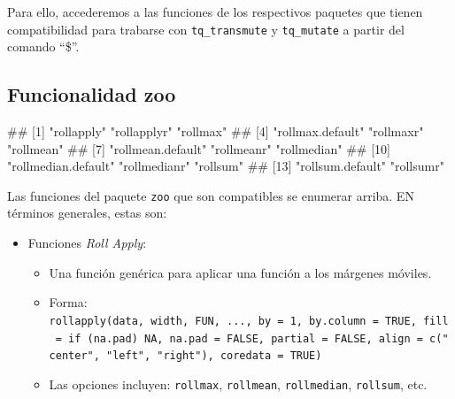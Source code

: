 \documentclass[
]{book}
\newenvironment{Shaded}{\begin{snugshade}}{\end{snugshade}}
\newcommand{\FunctionTok}[1]{\textcolor[rgb]{0.13,0.29,0.53}{\textbf{#1}}}
\newcommand{\NormalTok}[1]{#1}
\newcommand{\SpecialCharTok}[1]{\textcolor[rgb]{0.81,0.36,0.00}{\textbf{#1}}}
\providecommand{\tightlist}{%
  \setlength{\itemsep}{0pt}\setlength{\parskip}{0pt}}
\begin{document}
Para ello, accederemos a las funciones de los respectivos paquetes que tienen compatibilidad para trabarse con \texttt{tq\_transmute} y \texttt{tq\_mutate} a partir del comando ``\$''.

\hypertarget{funcionalidad-zoo}{%
\subsection{Funcionalidad zoo}\label{funcionalidad-zoo}}

\begin{Shaded}
\end{Shaded}

\begin{Shaded}
\begin{Highlighting}[]
\NormalTok{\#\#  [1] "rollapply"          "rollapplyr"         "rollmax"           }
\NormalTok{\#\#  [4] "rollmax.default"    "rollmaxr"           "rollmean"          }
\NormalTok{\#\#  [7] "rollmean.default"   "rollmeanr"          "rollmedian"        }
\NormalTok{\#\# [10] "rollmedian.default" "rollmedianr"        "rollsum"           }
\NormalTok{\#\# [13] "rollsum.default"    "rollsumr"}
\end{Highlighting}
\end{Shaded}

Las funciones del paquete \texttt{zoo} que son compatibles se enumerar arriba. EN términos generales, estas son:

\begin{itemize}
\item
  Funciones \emph{Roll Apply}:

  \begin{itemize}
  \tightlist
  \item
    Una función genérica para aplicar una función a los márgenes móviles.
  \item
    Forma: \texttt{rollapply(data,\ width,\ FUN,\ ...,\ by\ =\ 1,\ by.column\ =\ TRUE,\ fill\ =\ if\ (na.pad)\ NA,\ na.pad\ =\ FALSE,\ partial\ =\ FALSE,\ align\ =\ c("center",\ "left",\ "right"),\ coredata\ =\ TRUE)}
  \item
    Las opciones incluyen: \texttt{rollmax}, \texttt{rollmean}, \texttt{rollmedian}, \texttt{rollsum}, etc.
  \end{itemize}
\end{itemize}
\end{document}
